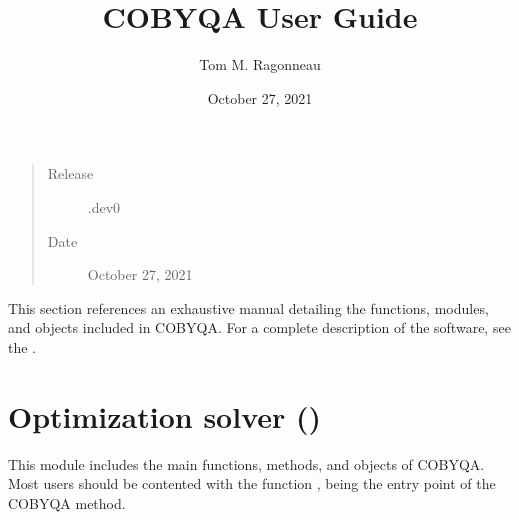 \documentclass[letterpaper,10pt,english]{sphinxmanual}
\title{COBYQA User Guide}
\date{October 27, 2021}
\author{Tom M. Ragonneau}
\begin{document}
\pagestyle{empty}
\sphinxmaketitle
\pagestyle{plain}
\sphinxtableofcontents
\pagestyle{normal}
\label{\detokenize{refs/index::doc}}

\begin{quote}\begin{description}
\item[{Release}] \leavevmode
{}.dev0

\item[{Date}] \leavevmode
\sphinxAtStartPar
October 27, 2021

\end{description}\end{quote}

\sphinxAtStartPar
This section references an exhaustive manual detailing the functions, modules,
and objects included in COBYQA. For a complete description of the software, see
the .
\label{\detokenize{refs/optimize:module-cobyqa}}

\chapter{Optimization solver ()}
\label{\detokenize{refs/optimize:optimization-solver-cobyqa}}\label{\detokenize{refs/optimize::doc}}
\sphinxAtStartPar
This module includes the main functions, methods, and objects of COBYQA. Most
users should be contented with the function {\hyperref[\detokenize{refs/generated/cobyqa.minimize:cobyqa.minimize}]{}}, being the entry
point of the COBYQA method.
\end{document}
